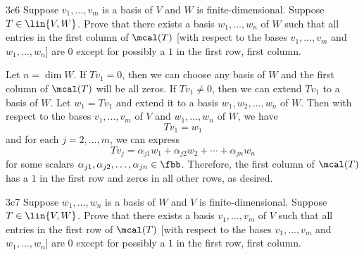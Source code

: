 \begin{exercise}{3c6}
    Suppose $v_1, \ldots, v_m$ is a basis of $V$ and $W$ is finite-dimensional.
	Suppose $T \in \lin{V, W}$.
	Prove that there exists a basis $w_1, \ldots, w_n$ of $W$ such that all entries in the first column of $\mcal(T)$ [with respect to the bases $v_1, \ldots, v_m$ and $w_1, \ldots, w_n$] are $0$ except for possibly a $1$ in the first row, first column.
\end{exercise}

\begin{sol}
    Let $n = \dim W$.
	If $Tv_1 = 0$, then we can choose any basis of $W$ and the first column of $\mcal(T)$ will be all zeros.
	If $Tv_1 \neq 0$, then we can extend $Tv_1$ to a basis of $W$.
	Let $w_1 = Tv_1$ and extend it to a basis $w_1, w_2, \ldots, w_n$ of $W$.
	Then with respect to the bases $v_1, \ldots, v_m$ of $V$ and $w_1, \ldots, w_n$ of $W$, we have
    \[
    	Tv_1 = w_1
    \]
    and for each $j = 2, \ldots, m$, we can express
    \[
    	Tv_j = \alpha_{j1} w_1 + \alpha_{j2} w_2 + \cdots + \alpha_{jn} w_n
    \]
    for some scalars $\alpha_{j1}, \alpha_{j2}, \ldots, \alpha_{jn} \in \fbb$.
	Therefore, the first column of $\mcal(T)$ has a $1$ in the first row and zeros in all other rows, as desired.
\end{sol}

\begin{exercise}{3c7}
    Suppose $w_1, \ldots, w_n$ is a basis of $W$ and $V$ is finite-dimensional.
	Suppose $T \in \lin{V, W}$.
	Prove that there exists a basis $v_1, \ldots, v_m$ of $V$ such that all entries in the first row of $\mcal(T)$ [with respect to the bases $v_1, \ldots, v_m$ and $w_1, \ldots, w_n$] are $0$ except for possibly a $1$ in the first row, first column.
\end{exercise}

